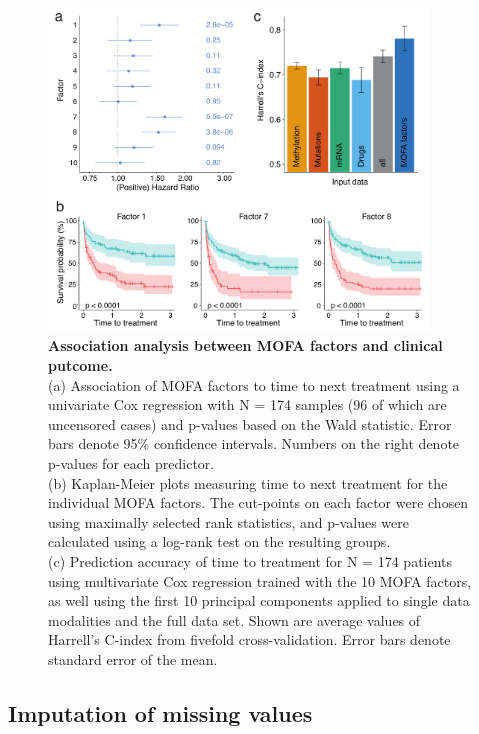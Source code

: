 \begin{figure}[H]
	\centering 	
	\includegraphics[width=0.9\textwidth]{MOFA_CLL_Cox}
	\caption{
	\textbf{Association analysis between MOFA factors and clinical putcome.}\\
	(a) Association of MOFA factors to time to next treatment using a univariate Cox regression with N = 174 samples (96 of which are uncensored cases) and p-values based on the Wald statistic. Error bars denote 95\% confidence intervals. Numbers on the right denote p-values for each predictor.\\
	(b) Kaplan-Meier plots measuring time to next treatment for the individual MOFA factors. The cut-points on each factor were chosen using maximally selected rank statistics, and p-values were calculated using a log-rank test on the resulting groups.\\
	(c) Prediction accuracy of time to treatment for N = 174 patients using multivariate Cox regression trained with the 10 MOFA factors, as well using the first 10 principal components applied to single data modalities and the full data set. Shown are average values of Harrell's C-index from fivefold cross-validation. Error bars denote standard error of the mean.
	}
	\label{fig:MOFA_CLL_Cox}
\end{figure}


\subsection{Imputation of missing values}

